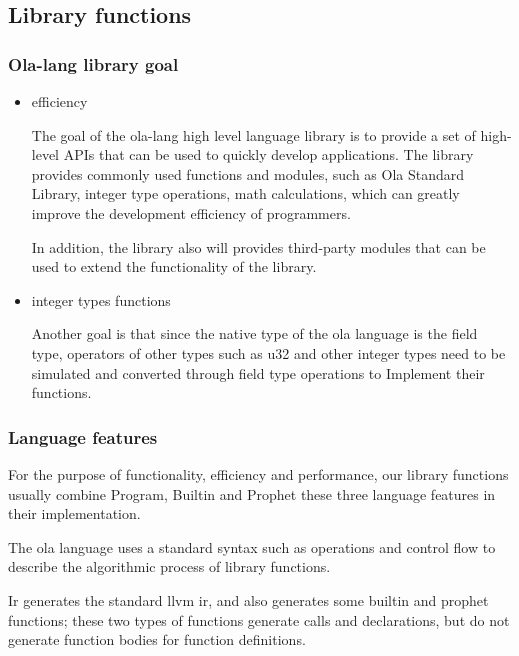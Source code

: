 \subsection{Library functions}

\subsubsection{Ola-lang library goal}

\begin{itemize}
    \item efficiency

    The goal of the ola-lang high level language library is to provide a set of high-level APIs that can be used to quickly develop applications.
The library provides commonly used functions and modules, such as Ola Standard Library, integer type operations, math calculations,
which can greatly improve the development efficiency of programmers.

    In addition, the library also will provides third-party modules that can be used to extend the functionality of the library.
    \item  integer types functions

    Another goal is that since the native type of the ola language is the field type,
operators of other types such as u32 and other integer types need to be simulated and converted through field type operations to Implement their functions.
\end{itemize}

\subsubsection{Language features}
    For the purpose of functionality, efficiency and performance, our library functions usually combine Program, Builtin and Prophet these three language features in their implementation.

    The ola language uses a standard syntax such as  operations and control flow to describe the algorithmic process of library functions.

    Ir generates the standard llvm ir, and also generates some builtin and prophet functions; these two types of functions generate calls and declarations, but do not generate function bodies for function definitions.


